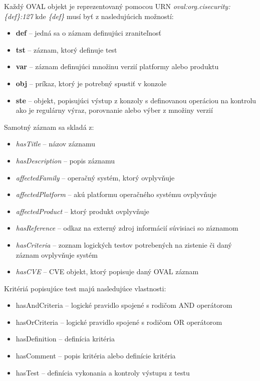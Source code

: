 \documentclass[12pt, a4paper, oneside]{book}
\begin{document}
Každý OVAL objekt je reprezentovaný pomocou URN \textit{oval:org.cisecurity:\{def\}:127} kde \textit{\{def\}} musí byť z nasledujúcich možností:
\begin{itemize}
\item \textbf{def} -- jedná sa o záznam definujúci zraniteľnosť
\item \textbf{tst} -- záznam, ktorý definuje test
\item \textbf{var} -- záznam definujúci množinu verzií platformy alebo produktu
\item \textbf{obj} -- príkaz, ktorý je potrebný spustiť v konzole
\item \textbf{ste} -- objekt, popisujúci výstup z konzoly s definovanou operáciou na kontrolu ako je regulárny výraz, porovnanie alebo výber z množiny verzií
\end{itemize}
Samotný záznam sa skladá z:
\begin{itemize}
\item \textit{hasTitle} -- názov záznamu
\item \textit{hasDescription} -- popis záznamu
\item \textit{affectedFamily} -- operačný systém, ktorý ovplyvňuje
\item \textit{affectedPlatform} -- akú platformu operačného systému ovplyvňuje
\item \textit{affectedProduct} -- ktorý produkt ovplyvňuje
\item \textit{hasReference} -- odkaz na externý zdroj informácií súvisiaci so záznamom
\item \textit{hasCriteria} -- zoznam logických testov potrebených na zistenie či daný záznam ovplyvňuje systém
\item \textit{hasCVE} -- CVE objekt, ktorý popisuje daný OVAL záznam
\end{itemize}
Kritériá popisujúce test majú nasledujúce vlastnosti:
\begin{itemize}
\item hasAndCriteria -- logické pravidlo spojené s rodičom AND operátorom
\item hasOrCriteria -- logické pravidlo spojené s rodičom OR operátorom
\item hasDefinition -- definícia kritéria
\item hasComment -- popis kritéria alebo definície kritéria
\item hasTest -- definícia vykonania a kontroly výstupu z testu
\end{itemize}
\end{document}
